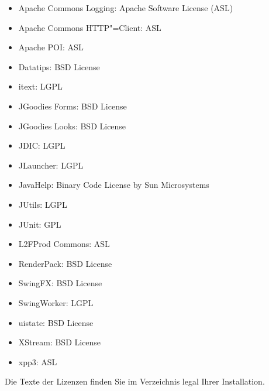 \documentclass[11pt,a4paper,twoside,ngerman]{article}
\begin{document}
\begin{itemize}

\item Apache Commons Logging: Apache Software License (ASL)


\item Apache Commons HTTP"=Client: ASL


\item Apache POI: ASL


\item Datatips: BSD License


\item itext: LGPL


\item JGoodies Forms: BSD License


\item JGoodies Looks: BSD License


\item JDIC: LGPL


\item JLauncher: LGPL


\item JavaHelp: Binary Code License by Sun Microsystems


\item JUtils: LGPL


\item JUnit: GPL


\item L2FProd Commons: ASL


\item RenderPack: BSD License


\item SwingFX: BSD License


\item SwingWorker: LGPL


\item uistate: BSD License


\item XStream: BSD License


\item xpp3: ASL


\end{itemize}
Die Texte der Lizenzen finden Sie im Verzeichnis \glqq{}legal\grqq{} Ihrer Installation.


\newpage
\end{document}
